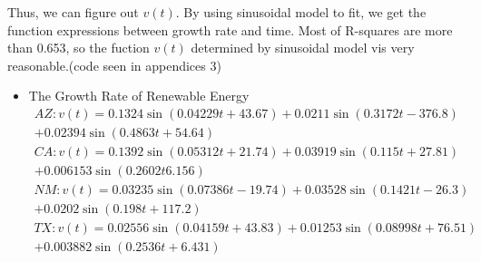 \documentclass{mcmthesis}
\begin{document}
Thus, we can figure out $ v(t) $. By using sinusoidal model to fit, we get the function expressions between growth rate and time. Most of R-squares are more than 0.653, so the fuction $  v(t) $ determined by sinusoidal model vis very reasonable.(code seen in appendices 3)
\begin{itemize}
	\item The Growth Rate of Renewable Energy\\
	\setlength\multlinegap{0em}
	\setlength\multlinetaggap{6em}
	\begin{multline}
	AZ:v(t)=0.1324\sin(0.04229t+43.67)+0.0211\sin(0.3172t-376.8)\\+0.02394\sin(0.4863t+54.64)%
	\end{multline}
	\begin{multline}
	CA:v(t)=0.1392\sin(0.05312t+21.74)+0.03919\sin(0.115t+27.81)\\+0.006153\sin(0.2602t6.156)%
	\end{multline}
	\begin{multline}
	NM:v(t)=0.03235\sin(0.07386t-19.74)+0.03528\sin(0.1421t-26.3)\\+0.0202\sin(0.198t+117.2)%
	\end{multline}
	\begin{multline}
	TX:v(t)=0.02556\sin(0.04159t+43.83)+0.01253\sin(0.08998t+76.51)\\+0.003882\sin(0.2536t+6.431)%
	\end{multline}
	\begin{figure}[htbp]
		\centering                                             %
\end{figure}
\end{itemize}
\end{document}
